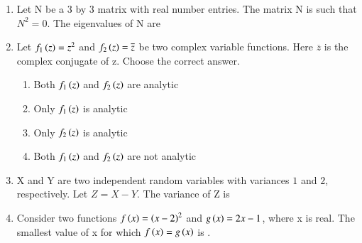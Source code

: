 \documentclass[journal,12pt,onecolumn]{IEEEtran}
\theoremstyle{remark}
\begin{document}
\begin{enumerate}
    \item Let N be a $3$ by $3$ matrix with real number entries. The matrix N is such that $N^{2}=0$. The eigenvalues of N are
    
    \hfill{}
    \begin{enumerate}
    \end{enumerate}

    \item Let $f_{1}\left(z\right)=z^{2}$ and $f_{2}\left(z\right)=\overline{z}$ be two complex variable functions. Here $\overline{z}$ is the complex conjugate of z. Choose the correct answer.
    
    \hfill{}
    \begin{enumerate}
        \item Both $f_{1}\left(z\right)$ and $f_{2}\left(z\right)$ are analytic
        \item Only $f_{1}\left(z\right)$ is analytic
        \item Only $f_{2}\left(z\right)$ is analytic
        \item Both $f_{1}\left(z\right)$ and $f_{2}\left(z\right)$ are not analytic
    \end{enumerate}
    
    \item X and Y are two independent random variables with variances $1$ and $2$, respectively. Let $Z=X-Y$. The variance of Z is
    
    \hfill{}
    \begin{enumerate}
    \end{enumerate}
    
    \item Consider two functions $f\left(x\right)=\left(x-2\right)^{2}$ and $g\left(x\right)=2x-1$, where x is real. The smallest value of x for which $f\left(x\right)=g\left(x\right)$ is \underline{\hspace{2cm}}.
    

\end{enumerate}
\end{document}
